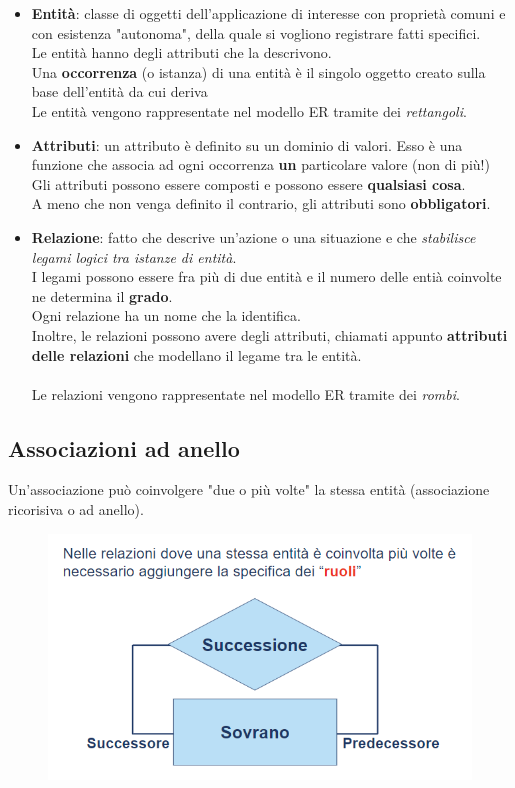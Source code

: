 \documentclass[12pt, a4paper]{article}
\begin{document}
    \begin{itemize}
        \item \textbf{Entità}: classe di oggetti dell'applicazione di interesse con proprietà comuni e con esistenza "autonoma",
        della quale si vogliono registrare fatti specifici.
        \\Le entità hanno degli attributi che la descrivono.
        \\Una \textbf{occorrenza} (o istanza) di una entità è il singolo oggetto creato sulla base dell'entità da cui deriva
        \\Le entità vengono rappresentate nel modello ER tramite dei \textit{rettangoli}.
        \item \textbf{Attributi}: un attributo è definito su un dominio di valori.
        Esso è una funzione che associa ad ogni occorrenza \textbf{un} particolare valore (non di più!)
        Gli attributi possono essere composti e possono essere \textbf{qualsiasi cosa}.
        \\A meno che non venga definito il contrario, gli attributi sono \textbf{obbligatori}.
        \item \textbf{Relazione}: fatto che descrive un'azione o una situazione e che \textit{stabilisce legami logici tra istanze di entità}.
        \\I legami possono essere fra più di due entità e il numero delle entià coinvolte ne determina il \textbf{grado}.
        \\Ogni relazione ha un nome che la identifica.
        \\Inoltre, le relazioni possono avere degli attributi, chiamati appunto \textbf{attributi delle relazioni} che
        modellano il legame tra le entità.
        \\\\Le relazioni vengono rappresentate nel modello ER tramite dei \textit{rombi}.
        
    \end{itemize}

    \newpage
    \subsection*{Associazioni ad anello}
    Un'associazione può coinvolgere "due o più volte" la stessa entità (associazione ricorisiva o ad anello).
    \begin{figure}[htbp]
        \centering
        \includegraphics[scale=0.7]{roles.png}
    \end{figure}
\end{document}
